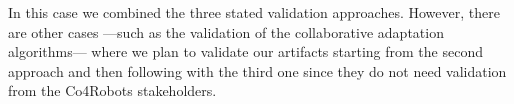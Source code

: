 
In this case we combined the three stated validation approaches.
However, there are other cases ---such as the validation of the collaborative adaptation algorithms--- where we plan to validate our artifacts starting from the second approach and then following with the third one since they do not need validation from the Co4Robots stakeholders.





